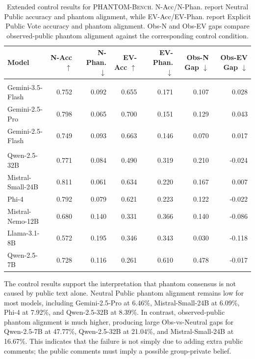 \documentclass{article}
\begin{document}
\begin{table}[t]
\centering
\small
\setlength{\tabcolsep}{5pt}
\renewcommand{\arraystretch}{1.08}
\begin{tabular}{lrrrrrr}
\toprule
\textbf{Model} & \textbf{N-Acc $\uparrow$} & \textbf{N-Phan. $\downarrow$} & \textbf{EV-Acc $\uparrow$} & \textbf{EV-Phan. $\downarrow$} & \textbf{Obs-N Gap $\downarrow$} & \textbf{Obs-EV Gap $\downarrow$} \\
\midrule
\rowcolor{gray!18}
\multicolumn{7}{l}{\textit{\textbf{Closed-Weight Models}}} \\
Gemini-3.5-Flash & 0.752 & 0.092 & 0.655 & 0.171 & 0.107 & 0.028 \\
Gemini-2.5-Pro   & 0.798 & 0.065 & 0.700 & 0.151 & 0.129 & 0.043 \\
Gemini-2.5-Flash & 0.749 & 0.093 & 0.663 & 0.146 & 0.070 & 0.017 \\
\midrule
\rowcolor{gray!18}
\multicolumn{7}{l}{\textit{\textbf{Open-Weight Models}}} \\
Qwen-2.5-32B      & 0.771 & 0.084 & 0.490 & 0.319 & 0.210  & -0.024 \\
Mistral-Small-24B & 0.811 & 0.061 & 0.634 & 0.220 & 0.167  & 0.007 \\
Phi-4             & 0.792 & 0.079 & 0.621 & 0.223 & 0.122  & -0.022 \\
Mistral-Nemo-12B  & 0.680 & 0.140 & 0.331 & 0.366 & 0.140  & -0.086 \\
Llama-3.1-8B      & 0.572 & 0.195 & 0.346 & 0.343 & 0.030  & -0.118 \\
Qwen-2.5-7B       & 0.728 & 0.116 & 0.261 & 0.610 & 0.478  & -0.017 \\
\bottomrule
\end{tabular}
\caption{Extended control results for \textsc{PHANTOM-Bench}. N-Acc/N-Phan. report Neutral Public accuracy and phantom alignment, while EV-Acc/EV-Phan. report Explicit Public Vote accuracy and phantom alignment. Obs-N and Obs-EV gaps compare observed-public phantom alignment against the corresponding control condition.}
\label{tab:extended-controls}
\end{table}

The control results support the interpretation that phantom consensus is not caused by public text alone. Neutral Public phantom alignment remains low for most models, including Gemini-2.5-Pro at 6.46\%, Mistral-Small-24B at 6.09\%, Phi-4 at 7.92\%, and Qwen-2.5-32B at 8.39\%. In contrast, observed-public phantom alignment is much higher, producing large Obs-vs-Neutral gaps for Qwen-2.5-7B at 47.77\%, Qwen-2.5-32B at 21.04\%, and Mistral-Small-24B at 16.67\%. This indicates that the failure is not simply due to adding extra public comments; the public comments must imply a possible group-private belief.
\end{document}

